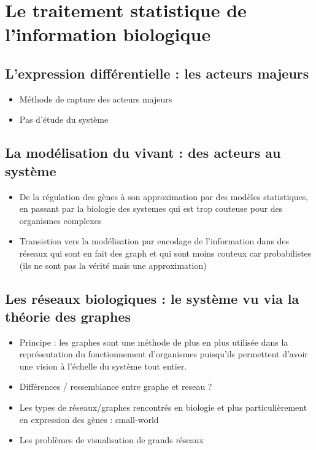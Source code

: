 \section{Le traitement statistique de l'information biologique}
\subsection{L'expression différentielle : les acteurs majeurs}
\begin{itemize}
  \item Méthode de capture des acteurs majeurs
  \item Pas d'étude du système 
\end{itemize}

\subsection{La modélisation du vivant : des acteurs au système}
\begin{itemize}
\item De la régulation des gènes à son approximation par des modèles statistiques, en passant par la biologie des systemes qui est trop couteuse pour des organismes complexes %
\item Transistion vers la modélisation par encodage de l'information dans des réseaux qui sont en fait des graph et qui sont moins couteux car probabilistes (ils ne sont pas la vérité mais une approximation)
\end{itemize}

\subsection{Les réseaux biologiques : le système vu via la théorie des graphes}
\begin{itemize}
\item Principe : les graphes sont une méthode de plus en plus utilisée dans la représentation du fonctionnement d'organismes puisqu'ils permettent d'avoir une vision à l'échelle du système tout entier.
\item Différences / ressemblance entre graphe et reseau ?
\item Les types de réseaux/graphes rencontrés en biologie et plus particulièrement en expression des gènes : small-world
\item Les problèmes de visualisation de grands réseaux %
\end{itemize}


